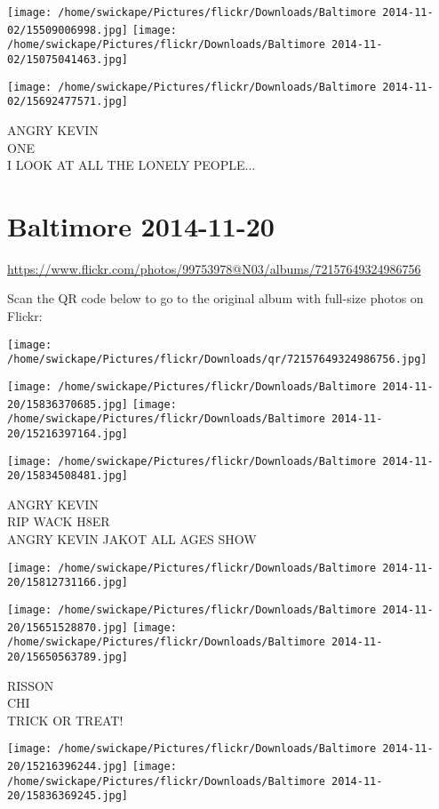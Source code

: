 \documentclass[10pt,letterpaper]{article}
\begin{document}
\texttt{[image: /home/swickape/Pictures/flickr/Downloads/Baltimore 2014-11-02/15509006998.jpg]}
\texttt{[image: /home/swickape/Pictures/flickr/Downloads/Baltimore 2014-11-02/15075041463.jpg]}

\texttt{[image: /home/swickape/Pictures/flickr/Downloads/Baltimore 2014-11-02/15692477571.jpg]}

ANGRY KEVIN\\
ONE\\
I LOOK AT ALL THE LONELY PEOPLE...
\pagebreak

\section*{Baltimore 2014-11-20}

\url{https://www.flickr.com/photos/99753978@N03/albums/72157649324986756}

Scan the QR code below to go to the original album with full-size photos on Flickr:

\texttt{[image: /home/swickape/Pictures/flickr/Downloads/qr/72157649324986756.jpg]}
\pagebreak

\texttt{[image: /home/swickape/Pictures/flickr/Downloads/Baltimore 2014-11-20/15836370685.jpg]}
\texttt{[image: /home/swickape/Pictures/flickr/Downloads/Baltimore 2014-11-20/15216397164.jpg]}

\texttt{[image: /home/swickape/Pictures/flickr/Downloads/Baltimore 2014-11-20/15834508481.jpg]}

ANGRY KEVIN\\
RIP WACK H8ER\\
ANGRY KEVIN JAKOT ALL AGES SHOW
\pagebreak

\texttt{[image: /home/swickape/Pictures/flickr/Downloads/Baltimore 2014-11-20/15812731166.jpg]}

\vspace{0.25in}
\texttt{[image: /home/swickape/Pictures/flickr/Downloads/Baltimore 2014-11-20/15651528870.jpg]}
\texttt{[image: /home/swickape/Pictures/flickr/Downloads/Baltimore 2014-11-20/15650563789.jpg]}

RISSON\\
CHI\\
TRICK OR TREAT!
\pagebreak

\texttt{[image: /home/swickape/Pictures/flickr/Downloads/Baltimore 2014-11-20/15216396244.jpg]}
\texttt{[image: /home/swickape/Pictures/flickr/Downloads/Baltimore 2014-11-20/15836369245.jpg]}
\end{document}

